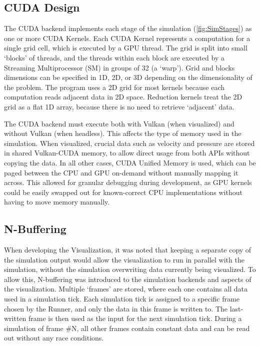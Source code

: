 \subsection{CUDA Design}\label{sec:Design:Simulation}

The CUDA backend implements each stage of the simulation (\cref{fig:SimStages}) as one or more CUDA Kernels.
Each CUDA Kernel represents a computation for a single grid cell, which is executed by a GPU thread.
The grid is split into small `blocks' of threads, and the threads within each block are executed by a Streaming Multiprocessor (SM) in groups of 32 (a `warp').%
Grid and blocks dimensions can be specified in 1D, 2D, or 3D depending on the dimensionality of the problem.
The program uses a 2D grid for most kernels because each computation reads adjacent data in 2D space.
Reduction kernels treat the 2D grid as a flat 1D array, because there is no need to retrieve `adjacent' data.

The CUDA backend must execute both with Vulkan (when visualized) and without Vulkan (when headless).
This affects the type of memory used in the simulation.
When visualized, crucial data such as velocity and pressure are stored in shared Vulkan-CUDA memory, to allow direct usage from both APIs without copying the data.
In all other cases, CUDA Unified Memory is used, which can be paged between the CPU and GPU on-demand without manually mapping it across\cite{Harris2017UnifiedBlog}.
This allowed for granular debugging during development, as GPU kernels could be easily swapped out for known-correct CPU implementations without having to move memory manually.


\subsection{N-Buffering}\label{sec:DesignSimNBuffer}
When developing the Visualization, it was noted that keeping a separate copy of the simulation output would allow the visualization to run in parallel with the simulation, without the simulation overwriting data currently being visualized.
To allow this, N-buffering was introduced to the simulation backends and aspects of the visualization.
Multiple `frames' are stored, where each one contains all data used in a simulation tick.
Each simulation tick is assigned to a specific frame chosen by the Runner, and only the data in this frame is written to.
The last-written frame is then used as the input for the next simulation tick.
During a simulation of frame \#N, all other frames contain constant data and can be read out without any race conditions.


